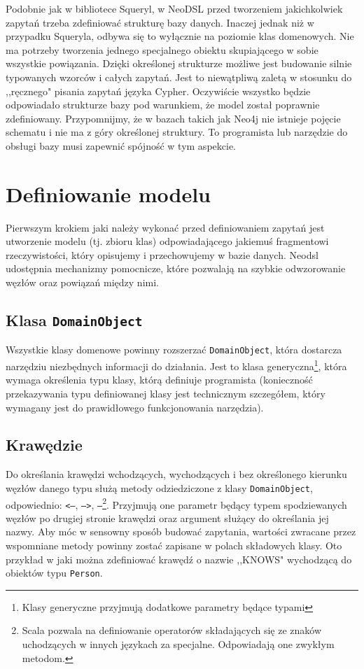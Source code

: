 \documentclass[brudnopis]{xmgr}
\begin{document}
Podobnie jak w bibliotece Squeryl, w NeoDSL przed tworzeniem jakichkolwiek zapytań trzeba zdefiniować strukturę bazy danych. Inaczej jednak niż w przypadku Squeryla, odbywa się to wyłącznie na poziomie klas domenowych. Nie ma potrzeby tworzenia jednego specjalnego obiektu skupiającego w sobie wszystkie powiązania. Dzięki określonej strukturze możliwe jest budowanie silnie typowanych wzorców i całych zapytań. Jest to niewątpliwą zaletą w stosunku do ,,ręcznego" pisania zapytań języka Cypher. Oczywiście wszystko będzie odpowiadało strukturze bazy pod warunkiem, że model został poprawnie zdefiniowany. Przypomnijmy, że w bazach takich jak Neo4j nie istnieje pojęcie schematu i nie ma z góry określonej struktury. To programista lub narzędzie do obsługi bazy musi zapewnić spójność w tym aspekcie.

\section{Definiowanie modelu}

Pierwszym krokiem jaki należy wykonać przed definiowaniem zapytań jest utworzenie modelu (tj. zbioru klas) odpowiadającego jakiemuś fragmentowi rzeczywistości, który opisujemy i przechowujemy w bazie danych. Neodsl udostępnia mechanizmy pomocnicze, które pozwalają na szybkie odwzorowanie węzłów oraz powiązań między nimi.

\subsection{Klasa \texttt{DomainObject}}

Wszystkie klasy domenowe powinny rozszerzać \texttt{DomainObject}, która dostarcza narzędziu niezbędnych informacji do działania. Jest to klasa generyczna\footnote{Klasy generyczne  przyjmują dodatkowe parametry będące typami}, która wymaga określenia typu klasy, którą definiuje programista (konieczność przekazywania typu definiowanej klasy jest technicznym szczegółem, który wymagany jest do prawidłowego funkcjonowania narzędzia). 

\subsection{Krawędzie}

Do określania krawędzi wchodzących, wychodzących i bez określonego kierunku węzłów danego typu służą metody odziedziczone z klasy \texttt{DomainObject}, odpowiednio:  \texttt{<--}, \texttt{-->}, \texttt{--}\footnote{Scala pozwala na definiowanie operatorów składających się ze znaków uchodzących w innych językach za specjalne. Odpowiadają one zwykłym metodom.}. Przyjmują one parametr będący typem spodziewanych węzłów po drugiej stronie krawędzi oraz argument służący do określania jej nazwy. Aby móc w sensowny sposób budować zapytania, wartości zwracane przez wspomniane metody powinny zostać zapisane w polach składowych klasy. Oto przykład w jaki można zdefiniować krawędź o nazwie ,,KNOWS" wychodzącą do obiektów typu \texttt{Person}.
\end{document}
